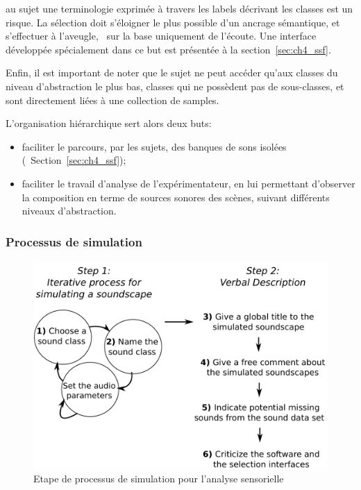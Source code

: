   au sujet une terminologie exprimée  à travers les labels décrivant les classes est un risque. La sélection doit s'éloigner le plus possible d'un ancrage sémantique, et s'effectuer à l'aveugle, \ie~sur la base uniquement de l'écoute. Une interface développée spécialement dans ce but est présentée à la section~\ref{sec:ch4_ssf}.

Enfin, il est important de noter que le sujet ne peut accéder qu'aux classes du niveau d'abstraction le plus bas, classes qui ne possèdent pas de sous-classes, et sont directement liées à une collection de samples.

L’organisation hiérarchique sert alors deux buts:

\begin{itemize}
\item faciliter le parcours, par les sujets, des banques de sons isolées (\cf~Section~\ref{sec:ch4_ssf});
\item faciliter le travail d'analyse de l'expérimentateur, en lui permettant d'observer la composition en terme de sources sonores des scènes, suivant différents niveaux d'abstraction.
\end{itemize}

\subsubsection{Processus de simulation}
\label{sec:ch4_processSimu}

\begin{figure}[t]
        \myfloatalign
        \includegraphics[width=.8\linewidth]{gfx/4}
       \caption{Etape de processus de simulation pour l'analyse sensorielle}\label{fig:etapeSimu}
\end{figure}

